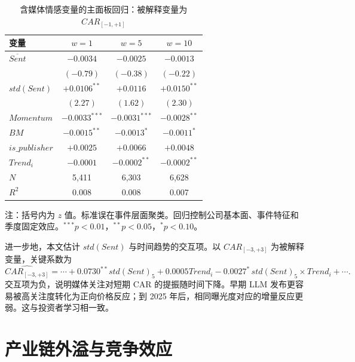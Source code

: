 \documentclass[11pt,fontset=fandol]{ctexart}
\begin{document}
\begin{table}[htbp]
\centering
\caption{含媒体情感变量的主面板回归：被解释变量为 $CAR_{[-1,+1]}$}
\label{tab:ols_sent}
\small
\begin{threeparttable}
\begin{tabular}{lccc}
\toprule
变量 & $w=1$ & $w=5$ & $w=10$ \\
\midrule
$\overline{Sent}$         & $-0.0034$       & $-0.0025$       & $-0.0013$ \\
                          & $(-0.79)$       & $(-0.38)$       & $(-0.22)$ \\
$std(Sent)$               & $+0.0106^{**}$  & $+0.0116$       & $+0.0150^{**}$ \\
                          & $(2.27)$        & $(1.62)$        & $(2.30)$ \\
$Momentum$                & $-0.0033^{***}$ & $-0.0031^{***}$ & $-0.0028^{**}$ \\
$BM$                      & $-0.0015^{**}$  & $-0.0013^{*}$   & $-0.0011^{*}$ \\
$is\_publisher$           & $+0.0025$       & $+0.0066$       & $+0.0048$ \\
$Trend_i$                 & $-0.0001$       & $-0.0002^{**}$  & $-0.0002^{**}$ \\
\midrule
$N$       & 5{,}411 & 6{,}303 & 6{,}628 \\
$R^2$     & 0.008 & 0.008 & 0.007 \\
\bottomrule
\end{tabular}
\begin{tablenotes}\footnotesize
\item 注：括号内为 $z$ 值。标准误在事件层面聚类。回归控制公司基本面、事件特征和季度固定效应。$^{***}p<0.01$，$^{**}p<0.05$，$^{*}p<0.10$。
\end{tablenotes}
\end{threeparttable}
\end{table}

进一步地，本文估计 $std(Sent)$ 与时间趋势的交互项。以 $CAR_{[-3,+3]}$ 为被解释变量，关键系数为
\begin{equation}
\widehat{CAR_{[-3,+3]}} =
\cdots
+ 0.0730^{**} std(Sent)_5
+ 0.0005 Trend_i
- 0.0027^{*}\, std(Sent)_5 \times Trend_i
+ \cdots .
\label{eq:h4_sent}
\end{equation}
交互项为负，说明媒体关注对短期 CAR 的提振随时间下降。早期 LLM 发布更容易被高关注度转化为正向价格反应；到 2025 年后，相同曝光度对应的增量反应更弱。这与投资者学习相一致。

\section{产业链外溢与竞争效应}
\label{sec:spill}
\end{document}
